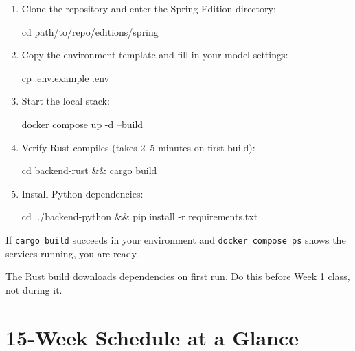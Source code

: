 \documentclass[
  11pt,
  oneside,
  DIV=12,
]{scrartcl}
\begin{document}
\begin{enumerate}
  \item Clone the repository and enter the Spring Edition directory:
  \begin{center}\ttfamily\small
    cd path/to/repo/editions/spring
  \end{center}

  \item Copy the environment template and fill in your model settings:
  \begin{center}\ttfamily\small
    cp .env.example .env
  \end{center}

  \item Start the local stack:
  \begin{center}\ttfamily\small
    docker compose up -d --build
  \end{center}

  \item Verify Rust compiles (takes 2--5 minutes on first build):
  \begin{center}\ttfamily\small
    cd backend-rust \&\& cargo build
  \end{center}

  \item Install Python dependencies:
  \begin{center}\ttfamily\small
    cd ../backend-python \&\& pip install -r requirements.txt
  \end{center}
\end{enumerate}

If \texttt{cargo build} succeeds in your environment and \texttt{docker compose ps} shows
the services running, you are ready.

\begin{watchout}
  The Rust build downloads dependencies on first run.
  Do this before Week 1 class, not during it.
\end{watchout}

\clearpage

\section*{15-Week Schedule at a Glance}
\end{document}
